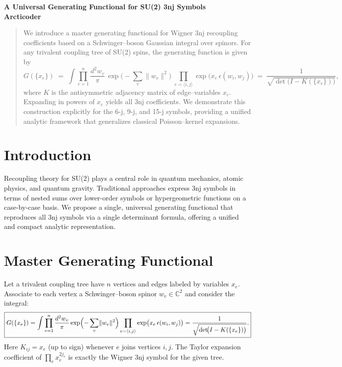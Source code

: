 \documentclass[11pt]{article}
\author{Arcticoder}
\date{May 24, 2025}
\begin{document}
\begin{center}
  {\LARGE \textbf{A Universal Generating Functional for SU(2) 3nj Symbols}}\\[1em]
  \textbf{Arcticoder}
\end{center}

\begin{abstract}
We introduce a master generating functional for Wigner 3nj recoupling coefficients based on
a Schwinger--boson Gaussian integral over spinors. For any trivalent coupling tree of SU(2) spins,
the generating function is given by
\[
  G(\{x_e\})
  \;=\;\int \prod_{v=1}^n \frac{d^2w_v}{\pi} \,\exp\bigl(-\sum_{v}\lVert w_v\rVert^2\bigr)
  \;\prod_{e=\langle i,j\rangle}\exp\bigl(x_e\,\epsilon(w_i,w_j)\bigr)
  \;=\;\frac{1}{\sqrt{\det\!\bigl(I - K(\{x_e\})\bigr)}},
\]
where $K$ is the antisymmetric adjacency matrix of edge--variables $x_e$. Expanding in powers of $x_e$
yields all 3nj coefficients. We demonstrate this construction explicitly for the 6-j, 9-j, and 15-j
symbols, providing a unified analytic framework that generalizes classical Poisson--kernel expansions.
\end{abstract}

\section{Introduction}
Recoupling theory for SU(2) plays a central role in quantum mechanics, atomic physics, and quantum
gravity. Traditional approaches express 3nj symbols in terms of nested sums over lower-order symbols
or hypergeometric functions on a case-by-case basis. We propose a single, universal generating functional
that reproduces all 3nj symbols via a single determinant formula, offering a unified and compact analytic representation.

\section{Master Generating Functional}
Let a trivalent coupling tree have $n$ vertices and edges labeled by variables $x_e$.
Associate to each vertex a Schwinger--boson spinor $w_v\in\mathbb{C}^2$ and consider the integral:
\begin{equation}\label{eq:master}
  \boxed{
  G(\{x_e\})
  = \int \prod_{v=1}^n \frac{d^2w_v}{\pi} 
    \exp\Bigl(-\sum_{v}\lVert w_v\rVert^2\Bigr)
    \prod_{e=\langle i,j\rangle}\exp\bigl(x_e\,\epsilon(w_i,w_j)\bigr)
  = \frac{1}{\sqrt{\det\!\bigl(I - K(\{x_e\})\bigr)}}.
  }
\end{equation}
Here $K_{ij}=x_e$ (up to sign) whenever $e$ joins vertices $i,j$. The Taylor expansion coefficient
of $\prod_e x_e^{2j_e}$ is exactly the Wigner 3nj symbol for the given tree.
\end{document}
